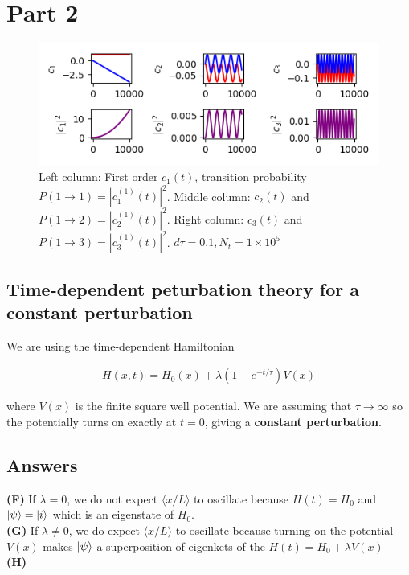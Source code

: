 \documentclass[12pt]{article}
\theoremstyle{definition}
\begin{document}
{\section{Part 2}

\begin{figure}
\includegraphics[scale=1.4]{Figure_2.png}
\centering
\caption{Left column: First order $c_{1}(t)$, transition probability $P(1\rightarrow 1) = |c_{1}^{(1)}(t)|^{2}$. Middle column: $c_{2}(t)$ and $P(1\rightarrow 2) = |c_{2}^{(1)}(t)|^{2}$. Right column: $c_{3}(t)$ and $P(1\rightarrow 3) = |c_{3}^{(1)}(t)|^{2}$. $d\tau = 0.1, N_{t} = 1\times 10^{5}$}
\end{figure}


\subsection{Time-dependent peturbation theory for a constant perturbation}


We are using the time-dependent Hamiltonian

\begin{align*}
H(x,t) = H_{0}(x) + \lambda(1-e^{-t/\tau})V(x)
\end{align*}

where $V(x)$ is the finite square well potential. We are assuming that $\tau\rightarrow\infty$ so the potentially turns on exactly at $t=0$, giving a \textbf{constant perturbation}. 

\subsection{Answers}


\noindent \textbf{(F)} If $\lambda = 0$, we do not expect $\langle x/L\rangle$ to oscillate because $H(t) = H_{0}$ and $\ket{\psi} = \ket{i}$ which is an eigenstate of $H_{0}$.\\
\noindent \textbf{(G)} If $\lambda \neq 0$, we do expect $\langle x/L\rangle$ to oscillate because turning on the potential $V(x)$ makes $\ket{\psi}$ a superposition of eigenkets of the $H(t) = H_{0} + \lambda V(x)$\\
\noindent \textbf{(H)}

}
\end{document}

